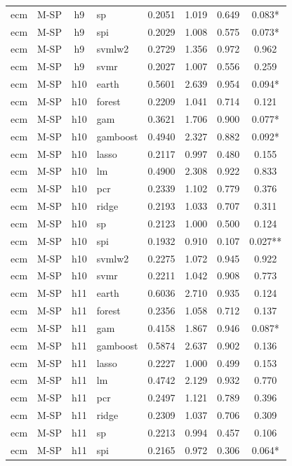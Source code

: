 \begin{ThreePartTable}
\begin{longtable}[t]{llclcccc}
ecm & M-SP & h9 & sp & 0.2051 & 1.019 & 0.649 & 0.083*\\
ecm & M-SP & h9 & spi & 0.2029 & 1.008 & 0.575 & 0.073*\\
ecm & M-SP & h9 & svmlw2 & 0.2729 & 1.356 & 0.972 & 0.962\\
ecm & M-SP & h9 & svmr & 0.2027 & 1.007 & 0.556 & 0.259\\
\addlinespace
ecm & M-SP & h10 & earth & 0.5601 & 2.639 & 0.954 & 0.094*\\
ecm & M-SP & h10 & forest & 0.2209 & 1.041 & 0.714 & 0.121\\
ecm & M-SP & h10 & gam & 0.3621 & 1.706 & 0.900 & 0.077*\\
ecm & M-SP & h10 & gamboost & 0.4940 & 2.327 & 0.882 & 0.092*\\
ecm & M-SP & h10 & lasso & 0.2117 & 0.997 & 0.480 & 0.155\\
ecm & M-SP & h10 & lm & 0.4900 & 2.308 & 0.922 & 0.833\\
ecm & M-SP & h10 & pcr & 0.2339 & 1.102 & 0.779 & 0.376\\
ecm & M-SP & h10 & ridge & 0.2193 & 1.033 & 0.707 & 0.311\\
ecm & M-SP & h10 & sp & 0.2123 & 1.000 & 0.500 & 0.124\\
ecm & M-SP & h10 & spi & 0.1932 & 0.910 & 0.107 & 0.027**\\
ecm & M-SP & h10 & svmlw2 & 0.2275 & 1.072 & 0.945 & 0.922\\
ecm & M-SP & h10 & svmr & 0.2211 & 1.042 & 0.908 & 0.773\\
\addlinespace
ecm & M-SP & h11 & earth & 0.6036 & 2.710 & 0.935 & 0.124\\
ecm & M-SP & h11 & forest & 0.2356 & 1.058 & 0.712 & 0.137\\
ecm & M-SP & h11 & gam & 0.4158 & 1.867 & 0.946 & 0.087*\\
ecm & M-SP & h11 & gamboost & 0.5874 & 2.637 & 0.902 & 0.136\\
ecm & M-SP & h11 & lasso & 0.2227 & 1.000 & 0.499 & 0.153\\
ecm & M-SP & h11 & lm & 0.4742 & 2.129 & 0.932 & 0.770\\
ecm & M-SP & h11 & pcr & 0.2497 & 1.121 & 0.789 & 0.396\\
ecm & M-SP & h11 & ridge & 0.2309 & 1.037 & 0.706 & 0.309\\
ecm & M-SP & h11 & sp & 0.2213 & 0.994 & 0.457 & 0.106\\
ecm & M-SP & h11 & spi & 0.2165 & 0.972 & 0.306 & 0.064*\\

\end{longtable}
\end{ThreePartTable}
